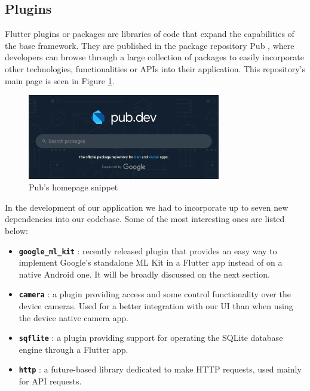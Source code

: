 \subsection{Plugins}

Flutter plugins or packages are libraries of code that expand the capabilities of the base framework. They are published in the package repository Pub \cite{noauthor_dart_nodate}, where developers can browse through a large collection of packages to easily incorporate other technologies, functionalities or APIs into their application. This repository's main page is seen in Figure \ref{fig:pub}.

\begin{figure}[h]
  \centering
  \includegraphics[width=0.75\textwidth]{Figures/pub.png}
  \caption{%
    Pub's homepage snippet
  }
  \label{fig:pub}
\end{figure}

In the development of our application we had to incorporate up to seven new dependencies into our codebase. Some of the most interesting ones are listed below:

\begin{itemize}
\item \textbf{\texttt{google\_ml\_kit}} \cite{noauthor_google_ml_kit_nodate}: recently released plugin that provides an easy way to implement Google's standalone ML Kit in a Flutter app instead of on a native Android one. It will be broadly discussed on the next section.
\item \textbf{\texttt{camera}} \cite{noauthor_camera_nodate}: a plugin providing access and some control functionality over the device cameras. Used for a better integration with our UI than when using the device native camera app.
\item \textbf{\texttt{sqflite}} \cite{noauthor_sqflite_nodate}: a plugin providing support for operating the SQLite database engine through a Flutter app.
\item \textbf{\texttt{http}} \cite{noauthor_http_nodate}: a future-based library dedicated to make HTTP requests, used mainly for API requests.
\end{itemize}

